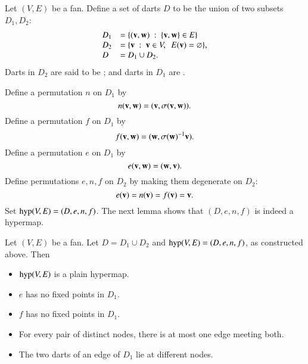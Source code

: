 Let $(V,E)$ be a fan.  Define a set of darts $D$ to be the union of
two subsets $D_1,D_2$:
\begin{displaymath}
\begin{array}{lll}
D_1 &= \{({\mathbf v},{\mathbf w})\ :\  \{{\mathbf v},{\mathbf w}\}\in E\}\\
D_2 &= \{{\mathbf v} \ :\  {\mathbf v}\in V,\ \ E({\mathbf v}) = \varnothing\},\\
D   &= D_1\cup D_2.
\end{array}
\end{displaymath}
Darts in $D_2$ are said to be ; and darts in
$D_1$ are .
%
%
%
%
%
%
%

Define a permutation $n$ on $D_1$ by
\begin{displaymath}n({\mathbf v},{\mathbf w}) = ({\mathbf v},\sigma({\mathbf v},{\mathbf w})).\end{displaymath}
Define a permutation $f$ on $D_1$ by
\begin{displaymath}
f ({\mathbf v},{\mathbf w}) = ({\mathbf w},\sigma({\mathbf w})^{-1} {\mathbf v}).
\end{displaymath}
Define a permutation $e$ on $D_1$ by
\begin{displaymath}
e ({\mathbf v},{\mathbf w}) = ({\mathbf w},{\mathbf v}).
\end{displaymath}
Define permutations $e,n,f$ on $D_2$ by making them degenerate on $D_2$:
\begin{displaymath}
e ({\mathbf v}) = n({\mathbf v}) = f({\mathbf v}) = {\mathbf v}.
\end{displaymath}
Set %
${\operatorname{hyp}}(V,E)=(D,e,n,f)$. %
The next lemma shows that $(D,e,n,f)$ is indeed a hypermap.



\begin{lemma}
Let $(V,E)$ be a fan.  Let $D = D_1\cup D_2$
and ${\operatorname{hyp}}(V,E) = (D,e,n,f)$, as constructed above.  Then
\begin{itemize}
\item ${\operatorname{hyp}}(V,E)$ is a plain hypermap.
\item  $e$ has no fixed
points in $D_1$.
\item  $f$ has no fixed points in $D_1$.
\item For every pair of distinct nodes, there is at most one
edge meeting both.
\item The two darts of an edge of $D_1$ lie at different nodes.
\end{itemize}
%
\end{lemma}

